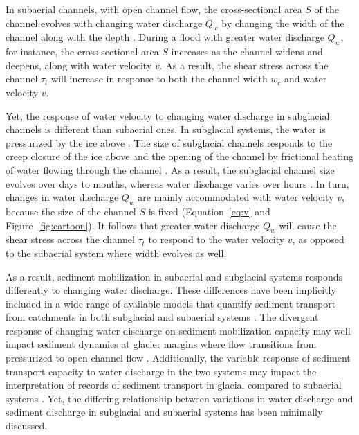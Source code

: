\documentclass[11pt]{article}
\begin{document}
\begin{spacing}{1}
  In subaerial channels, with open channel flow, the cross-sectional area $S$ of the channel evolves with changing water discharge $Q_w$  by changing the width of the channel along with the depth \citep{leopold1953}. During a flood with greater water discharge $Q_w$, for instance, the cross-sectional area $S$ increases as the channel widens and deepens, along with water velocity $v$. As a result, the shear stress across the channel $\tau_t$ will increase in response to both the channel width $w_c$  and water velocity $v$. 

  Yet, the response of water velocity to changing water discharge in subglacial channels is different than subaerial ones.
  In subglacial systems, the water is pressurized by the ice above \citep{shreve1972}.
  The size of subglacial channels responds to the creep closure of the ice above and the opening of the channel by frictional heating of water flowing through the channel \citep{rothlisberger1972}.
  As a result, the subglacial channel size evolves over days to months, whereas water discharge varies over hours \citep[e.g.][]{iken1986,andrews2014,nanni2020}.
  In turn, changes in water discharge $Q_w$ are mainly accommodated with water velocity $v$, because the size of the channel $S$ is fixed (Equation~\ref{eq:v} and Figure~\ref{fig:cartoon}).
  It follows that greater water discharge $Q_w$ will cause the shear stress across the channel $\tau_t$ to respond to the water velocity $v$, as opposed to the subaerial system where width evolves as well. 

  As a result, sediment mobilization in subaerial and subglacial systems responds differently to changing water discharge.
  These differences have been implicitly included in a wide range of available models that  quantify sediment transport from catchments in both subglacial and subaerial systems  \citep[e.g.][]{walder1994,tucker1997,creyts2013,wickert2019,hewitt2019}.
  The divergent response of changing water discharge on sediment mobilization capacity may well impact sediment dynamics at glacier margins where flow transitions from pressurized to open channel flow \citep[e.g.][]{lane2016}.
  Additionally, the variable response of sediment transport capacity to water discharge in the two systems may impact the interpretation of records of sediment transport in glacial compared to subaerial systems \citep[e.g.][]{muller1968,richards2003,ganti2016}.
  Yet, the differing relationship between variations in water discharge and sediment discharge in subglacial and subaerial systems has been minimally discussed.
  

\end{spacing}
\end{document}
